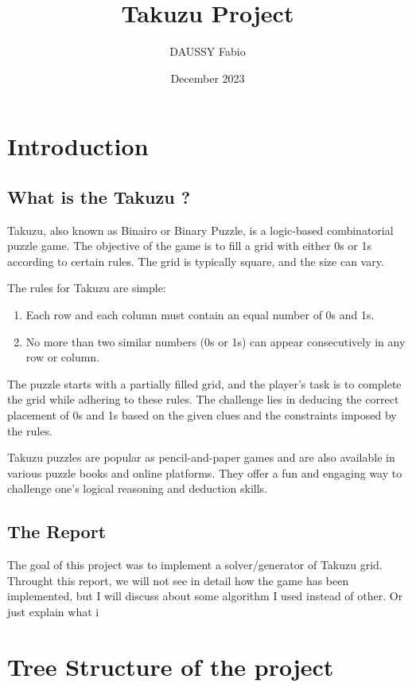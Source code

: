 \documentclass[a4paper,12pt]{article}
\title{Takuzu Project}
\author{DAUSSY Fabio}
\date{December 2023}
\begin{document}
\maketitle


\section{Introduction}

\subsection{What is the Takuzu ?}
Takuzu, also known as Binairo or Binary Puzzle, is a logic-based combinatorial puzzle game. The objective of the game is to fill a grid with either 0s or 1s according to certain rules. The grid is typically square, and the size can vary.

The rules for Takuzu are simple:
\begin{enumerate}
    \item Each row and each column must contain an equal number of 0s and 1s.
    \item No more than two similar numbers (0s or 1s) can appear consecutively in any row or column.
\end{enumerate}



The puzzle starts with a partially filled grid, and the player's task is to complete the grid while adhering to these rules. The challenge lies in deducing the correct placement of 0s and 1s based on the given clues and the constraints imposed by the rules.

Takuzu puzzles are popular as pencil-and-paper games and are also available in various puzzle books and online platforms. They offer a fun and engaging way to challenge one's logical reasoning and deduction skills.


\subsection{The Report}

The goal of this project was to implement a 
solver/generator of Takuzu grid. Throught this report, 
we will not see in detail how the game has been implemented, but I will discuss
about some algorithm I used instead of other. Or just explain what i  

\section{Tree Structure of the project}
\end{document}
